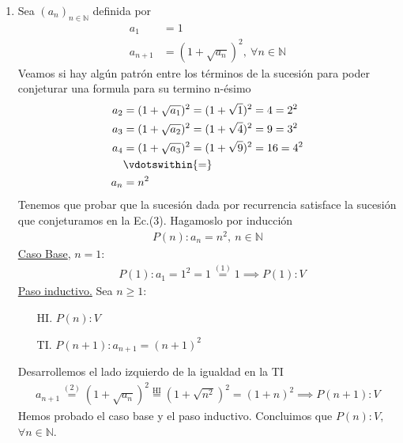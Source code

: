 \begin{enumerate}[label=\roman*)]
    \item Sea $(a_n)_{n \in \mathbb{N}}$ definida por
    \setcounter{equation}{0}
    \begin{align}
        a_1 &= 1 \\
        a_{n+1} &= (1 + \sqrt{a_n})^2,\ \forall n \in \mathbb{N}
    \end{align}
    Veamos si hay algún patrón entre los términos de la sucesión para poder conjeturar una formula para su termino 
    n-ésimo
    \begin{align}
        a_2 &= (1 +\sqrt{a_1})^2 = (1 + \sqrt{1})^2 = 4 = 2^2 \nonumber \\
        a_3 &= (1 +\sqrt{a_2})^2 = (1 + \sqrt{4})^2 = 9 = 3^2 \nonumber \\
        a_4 &= (1 +\sqrt{a_3})^2 = (1 + \sqrt{9})^2 = 16 = 4^2 \nonumber \\
        &\vdotswithin{=} \nonumber \\
        a_n &= n^2
    \end{align}
    Tenemos que probar que la sucesión dada por recurrencia satisface la sucesión que conjeturamos en la Ec.(3). 
    Hagamoslo por inducción
    \begin{align*}
        P(n): a_n = n^2, \ n \in \mathbb{N}   
    \end{align*}
    \underline{Caso Base}, $n = 1$:
	    \begin{align*}
		    &P(1): a_1 = 1^2 = 1 \overset{(1)}{=} 1 \implies P(1):V
	    \end{align*}
	\underline{Paso inductivo.} Sea $n \geq 1$:
	\begin{enumerate}
        \item[HI.] $P(n): V$
        \item[TI.] $P(n+1): a_{n+1} = (n+1)^2$
    \end{enumerate}
 	Desarrollemos el lado izquierdo de la igualdad en la TI
    \begin{align*}
  	    a_{n+1} \overset{(2)}{=} (1 + \sqrt{a_n})^2 \overset{\text{HI}}{=} (1 + \sqrt{n^2})^2 = (1 + n)^2 
        \implies P(n+1):V
    \end{align*}
    Hemos probado el caso base y el paso inductivo. Concluimos que $P(n):V,$ $\forall n \in \mathbb{N}$.


\end{enumerate}
